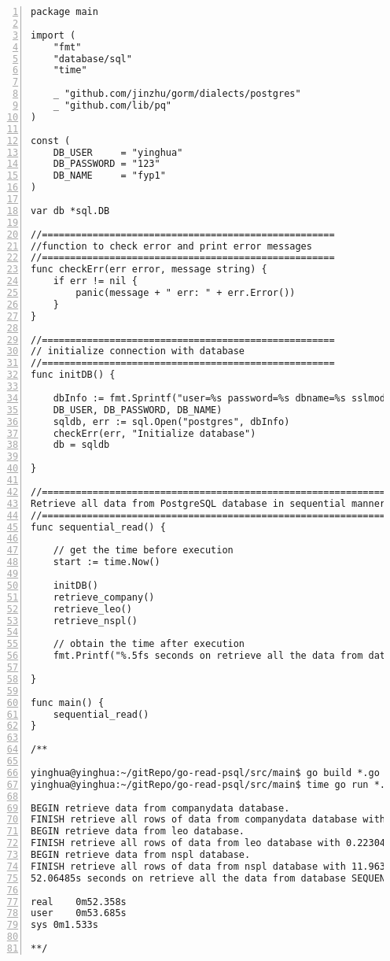 \lstset{basicstyle=\ttfamily\tiny}  
\begin{lstlisting}[breaklines, frame=single, numbers=left, caption={Main function for sequential execution. (main.go)}, label=commandline-02]
package main

import (
	"fmt"
	"database/sql"
	"time"
	
	_ "github.com/jinzhu/gorm/dialects/postgres"
	_ "github.com/lib/pq"
)

const (
	DB_USER     = "yinghua"
	DB_PASSWORD = "123"
	DB_NAME     = "fyp1"
)

var db *sql.DB

//====================================================
//function to check error and print error messages
//====================================================
func checkErr(err error, message string) {
	if err != nil {
		panic(message + " err: " + err.Error())
	}
}

//====================================================
// initialize connection with database
//====================================================
func initDB() {

	dbInfo := fmt.Sprintf("user=%s password=%s dbname=%s sslmode=disable",
	DB_USER, DB_PASSWORD, DB_NAME)
	sqldb, err := sql.Open("postgres", dbInfo)
	checkErr(err, "Initialize database")
	db = sqldb

}

//==============================================================
Retrieve all data from PostgreSQL database in sequential manner 
//==============================================================
func sequential_read() {

	// get the time before execution
	start := time.Now()
	
	initDB()
	retrieve_company()
	retrieve_leo()
	retrieve_nspl()
	
	// obtain the time after execution
	fmt.Printf("%.5fs seconds on retrieve all the data from database SEQUENTIALLY. \n", time.Since(start).Seconds())

}

func main() {
	sequential_read()
}

/** 

yinghua@yinghua:~/gitRepo/go-read-psql/src/main$ go build *.go 
yinghua@yinghua:~/gitRepo/go-read-psql/src/main$ time go run *.go

BEGIN retrieve data from companydata database.
FINISH retrieve all rows of data from companydata database with 39.87781s seconds. 
BEGIN retrieve data from leo database.
FINISH retrieve all rows of data from leo database with 0.22304s seconds. 
BEGIN retrieve data from nspl database.
FINISH retrieve all rows of data from nspl database with 11.96392s seconds. 
52.06485s seconds on retrieve all the data from database SEQUENTIALLY. 

real	0m52.358s
user	0m53.685s
sys	0m1.533s

**/
\end{lstlisting}

